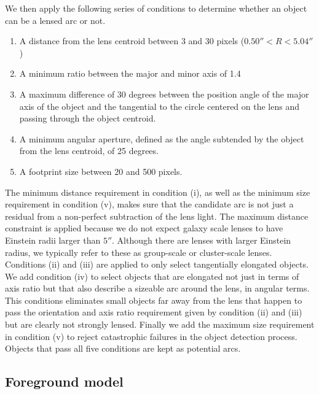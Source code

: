 \documentclass[a4paper,fleqn,usenatbib]{mnras}
\begin{document}
We then apply the following series of conditions to determine whether an object can be a lensed arc or not.
%
\begin{enumerate}
\item A distance from the lens centroid between 3 and 30 pixels ($0.50'' < R < 5.04''$)
\item A minimum ratio between the major and minor axis of 1.4
\item A maximum difference of 30 degrees between the position angle of the major axis of the object and the tangential to the circle centered on the lens and passing through the object centroid.
\item A minimum angular aperture, defined as the angle subtended by the object from the lens centroid, of 25 degrees.
\item A footprint size between 20 and 500 pixels.
\end{enumerate}
%
The minimum distance requirement in condition (i), as well as the minimum size requirement in condition (v), makes sure that the candidate arc is not just a residual from a non-perfect subtraction of the lens light. The maximum distance constraint is applied because we do not expect galaxy scale lenses to have Einstein radii larger than $5''$. Although there are lenses with larger Einstein radius, we typically refer to these as group-scale or cluster-scale lenses.
Conditions (ii) and (iii) are applied to only select tangentially elongated objects.
We add condition (iv) to select objects that are elongated not just in terms of axis ratio but that also describe a sizeable arc around the lens, in angular terms. This conditions eliminates small objects far away from the lens that happen to pass the orientation and axis ratio requirement given by condition (ii) and (iii) but are clearly not strongly lensed.
Finally we add the maximum size requirement in condition (v) to reject catastrophic failures in the object detection process.
Objects that pass all five conditions are kept as potential arcs.

\subsection{Foreground model}\label{ssec:foreground}
\end{document}
